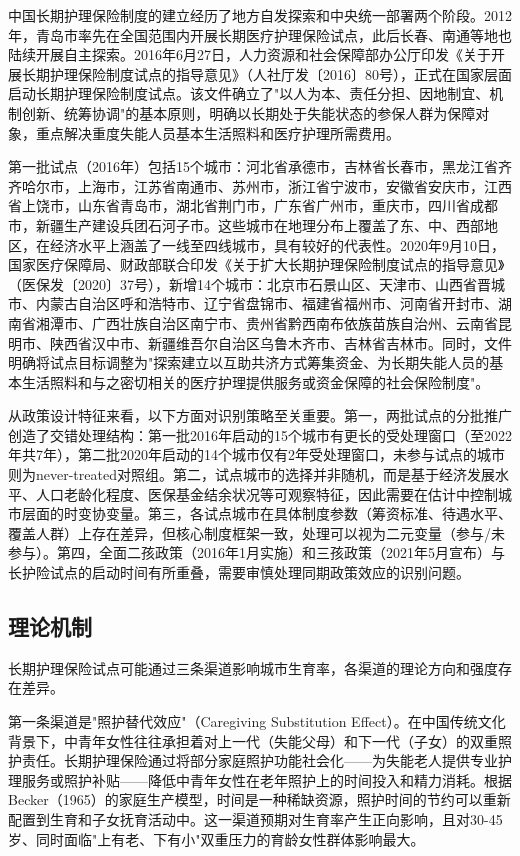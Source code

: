 \documentclass[11pt,a4paper]{article}
\begin{document}
中国长期护理保险制度的建立经历了地方自发探索和中央统一部署两个阶段。2012年，青岛市率先在全国范围内开展长期医疗护理保险试点，此后长春、南通等地也陆续开展自主探索。2016年6月27日，人力资源和社会保障部办公厅印发《关于开展长期护理保险制度试点的指导意见》（人社厅发〔2016〕80号），正式在国家层面启动长期护理保险制度试点。该文件确立了"以人为本、责任分担、因地制宜、机制创新、统筹协调"的基本原则，明确以长期处于失能状态的参保人群为保障对象，重点解决重度失能人员基本生活照料和医疗护理所需费用。

第一批试点（2016年）包括15个城市：河北省承德市，吉林省长春市，黑龙江省齐齐哈尔市，上海市，江苏省南通市、苏州市，浙江省宁波市，安徽省安庆市，江西省上饶市，山东省青岛市，湖北省荆门市，广东省广州市，重庆市，四川省成都市，新疆生产建设兵团石河子市。这些城市在地理分布上覆盖了东、中、西部地区，在经济水平上涵盖了一线至四线城市，具有较好的代表性。2020年9月10日，国家医疗保障局、财政部联合印发《关于扩大长期护理保险制度试点的指导意见》（医保发〔2020〕37号），新增14个城市：北京市石景山区、天津市、山西省晋城市、内蒙古自治区呼和浩特市、辽宁省盘锦市、福建省福州市、河南省开封市、湖南省湘潭市、广西壮族自治区南宁市、贵州省黔西南布依族苗族自治州、云南省昆明市、陕西省汉中市、新疆维吾尔自治区乌鲁木齐市、吉林省吉林市。同时，文件明确将试点目标调整为"探索建立以互助共济方式筹集资金、为长期失能人员的基本生活照料和与之密切相关的医疗护理提供服务或资金保障的社会保险制度"。

从政策设计特征来看，以下方面对识别策略至关重要。第一，两批试点的分批推广创造了交错处理结构：第一批2016年启动的15个城市有更长的受处理窗口（至2022年共7年），第二批2020年启动的14个城市仅有2年受处理窗口，未参与试点的城市则为never-treated对照组。第二，试点城市的选择并非随机，而是基于经济发展水平、人口老龄化程度、医保基金结余状况等可观察特征，因此需要在估计中控制城市层面的时变协变量。第三，各试点城市在具体制度参数（筹资标准、待遇水平、覆盖人群）上存在差异，但核心制度框架一致，处理可以视为二元变量（参与/未参与）。第四，全面二孩政策（2016年1月实施）和三孩政策（2021年5月宣布）与长护险试点的启动时间有所重叠，需要审慎处理同期政策效应的识别问题。

\subsection{理论机制}

长期护理保险试点可能通过三条渠道影响城市生育率，各渠道的理论方向和强度存在差异。

第一条渠道是"照护替代效应"（Caregiving Substitution Effect）。在中国传统文化背景下，中青年女性往往承担着对上一代（失能父母）和下一代（子女）的双重照护责任。长期护理保险通过将部分家庭照护功能社会化——为失能老人提供专业护理服务或照护补贴——降低中青年女性在老年照护上的时间投入和精力消耗。根据Becker（1965）的家庭生产模型，时间是一种稀缺资源，照护时间的节约可以重新配置到生育和子女抚育活动中。这一渠道预期对生育率产生正向影响，且对30-45岁、同时面临"上有老、下有小"双重压力的育龄女性群体影响最大。
\end{document}
